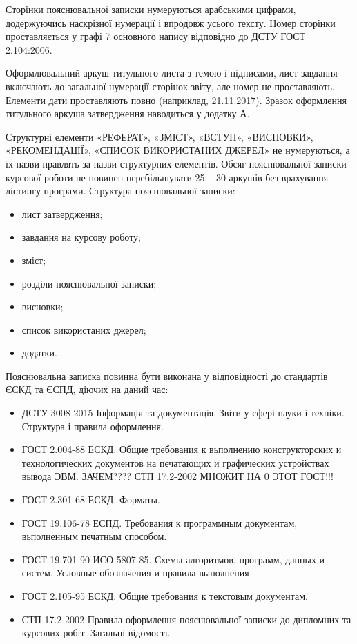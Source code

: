 Сторінки пояснювальної записки  нумеруються арабськими цифрами, додержуючись наскрізної нумерації і впродовж усього тексту. Номер сторінки проставляється у графі 7 основного напису відповідно до ДСТУ ГОСТ 2.104:2006.

Оформлювальний аркуш титульного листа з темою і підписами, лист завдання  включають до загальної нумерації сторінок звіту, але номер не проставляють. Елементи дати проставляють повно (наприклад, 21.11.2017).  Зразок оформлення титульного аркуша затвердження наводиться у додатку А. 

Структурні елементи «РЕФЕРАТ», «ЗМІСТ», «ВСТУП», «ВИСНОВКИ», «РЕКОМЕНДАЦІЇ», «СПИСОК ВИКОРИСТАНИХ ДЖЕРЕЛ» не нумеруються, а їх назви правлять за назви структурних елементів.
Обсяг пояснювальної записки курсової роботи не повинен перебільшувати 25 – 30 аркушів без врахування лістингу програми.
Структура пояснювальної записки:

\begin{itemize}
\item лист затвердження;
\item завдання на курсову роботу;
\item зміст;
\item розділи пояснювальної записки;
\item висновки;
\item список використаних джерел;
\item додатки.
\end{itemize}


Пояснювальна записка повинна бути виконана у відповідності до стандартів ЄСКД та ЄСПД, діючих на даний час:
\begin{itemize}
\item ДСТУ 3008-2015 Інформація та документація. Звіти у сфері науки і техніки. Структура і правила оформлення.
\item ГОСТ 2.004-88 ЕСКД. Общие требования к вьполнению конструкторских и технологических документов на печатающих и графических устройствах вывода ЭВМ. ЗАЧЕМ???? СТП 17.2-2002 МНОЖИТ НА 0 ЭТОТ ГОСТ!!!
\item ГОСТ 2.301-68 ЕСКД. Форматы.
\item ГОСТ 19.106-78 ЕСПД. Требования к программным документам, вьполненным печатным способом.
\item ГОСТ 19.701-90 ИСО 5807-85. Схемы алгоритмов, программ, данных и систем. Условные обозначения и правила выполнения
\item ГОСТ 2.105-95 ЕСКД. Общие требования к текстовым документам.
\item СТП 17.2-2002 Правила оформлення пояснювальної записки до дипломних та курсових робіт. Загальні відомості.
\end{itemize}


